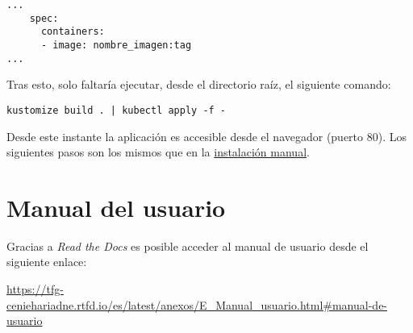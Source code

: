 \begin{verbatim}
...
    spec:
      containers:
      - image: nombre_imagen:tag
...
\end{verbatim}

Tras esto, solo faltaría ejecutar, desde el directorio raíz, el
siguiente comando:

\begin{verbatim}
kustomize build . | kubectl apply -f -
\end{verbatim}
Desde este instante la aplicación es accesible desde el navegador
(puerto 80). Los siguientes pasos son los mismos que en la
\href{Manual}{instalación manual}.


\section{Manual del usuario}

Gracias a \emph{Read the Docs} es posible acceder al manual de usuario desde el siguiente enlace:

\begin{mdframed}[outerlinecolor=red,outerlinewidth=2pt,linecolor=mucolor,middlelinewidth=3pt,roundcorner=10pt,nobreak=true]
  \begin{center}
    \url{https://tfg-ceniehariadne.rtfd.io/es/latest/anexos/E_Manual_usuario.html#manual-de-usuario}
  \end{center}
\end{mdframed}





